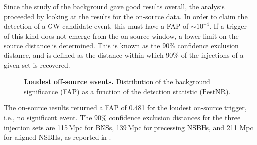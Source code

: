 \documentclass[binding=0.6cm, LaM]{sapthesis}
\begin{document}
	Since the study of the background gave good results overall,
	the analysis proceeded by looking at the results for the on-source data.
	In order to claim the detection of a GW candidate event, this 
	must have a FAP of $\sim 10^{-4}$.  If a trigger of this kind does not emerge from the on-source window,
	a lower limit on the source distance is determined.
        This is known as the 90\% confidence exclusion distance, and is
	defined as the distance within which 90\% of the injections of a given set is recovered.
        \begin{figure}[!t]
          \noindent
          \label{loudestoffsourcevent1}
          \centering
          \caption{\textbf{Loudest off-source events.} Distribution of the background significance (FAP) as a function of the detection statistic (BestNR).}
          \label{fig:loudestoffsourcevent1}
        \end{figure}
	The on-source results returned a FAP of 0.481 for the loudest on-source trigger, i.e., no significant event. 
	The 90\% confidence exclusion distances for the three injection sets are 115\,Mpc for BNSs, 
	139\,Mpc for precessing NSBHs, and 211 Mpc for aligned NSBHs, as reported in \cite{43}.
\end{document}
